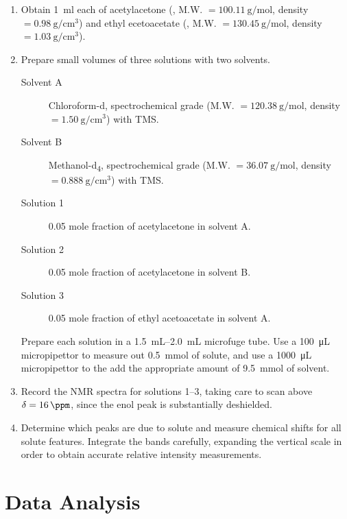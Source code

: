 \documentclass[nobib,nofonts,nols,nohyper]{tufte-handout}
\begin{document}
\begin{enumerate}
	\item Obtain \SI{1}{\ml} each of acetylacetone (, M.W. \( = \SI{100.11}{\g\per\mol} \), density \( = \SI{0.98}{\g\per\cm\cubed} \)) and ethyl ecetoacetate (, M.W. \( = \SI{130.45}{\g\per\mol} \), density \( = \SI{1.03}{\g\per\cm\cubed} \)). 
	\item Prepare small volumes of three solutions with two solvents. 
	\begin{description}
		\item[Solvent A] Chloroform-d, spectrochemical grade (M.W. \( = \SI{120.38}{\g\per\mol} \), density \( = \SI{1.50}{\g\per\cm\cubed} \)) with TMS. 
		\item[Solvent B] Methanol-d\textsubscript{4}, spectrochemical grade (M.W. \( = \SI{36.07}{\g\per\mol} \), density \( = \SI{0.888}{\g\per\cm\cubed} \)) with TMS.
		\item[Solution 1] \num{0.05} mole fraction of acetylacetone in solvent A.
		\item[Solution 2] \num{0.05} mole fraction of acetylacetone in solvent B.
		\item[Solution 3] \num{0.05} mole fraction of ethyl acetoacetate in solvent A.
	\end{description}
	Prepare each solution in a \SIrange{1.5}{2.0}{\mL} microfuge tube. 
	Use a \SI{100}{\uL} micropipettor  to measure out \SI{0.5}{\milli\mole} of solute, and use a \SI{1000}{\uL} micropipettor to the add the appropriate amount of \SI{9.5}{\milli\mole} of solvent. 
	\item Record the NMR spectra for solutions \numrange{1}{3}, taking care to scan above \( \delta = \SI{16}{\ppm} \), since the enol  peak is substantially deshielded. 
	\item Determine which peaks are due to solute and measure chemical shifts for all solute features. Integrate the bands carefully, expanding the vertical scale in order to obtain accurate relative intensity measurements. 
\end{enumerate}


\section{Data Analysis} %
\label{sec:data_analysis}
\end{document}
